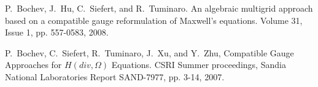 \documentclass{report}
\begin{document}
\begin{thebibliography}{99}
 P.~Bochev, J.~Hu, C.~Siefert, and R.~Tuminaro.
\newblock An algebraic multigrid approach based on a compatible gauge
reformulation of {M}axwell's equations.
 Volume 31, Issue 1, pp. 557-0583, 2008.

 P.~Bochev, C.~Siefert, R.~Tuminaro, J.~Xu, and Y.~Zhu,
Compatible Gauge Approaches for $H(div,\Omega)$ Equations. CSRI Summer
proceedings, Sandia National Laboratories Report SAND-7977, pp. 3-14,
2007.
\end{thebibliography}
\end{document}
